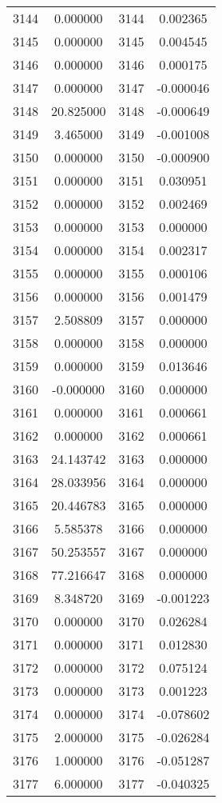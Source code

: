 \documentclass[12pt]{article}
\begin{document}
\begin{longtable}{@{}cccc@{}}
3144 & 0.000000 & 3144 & 0.002365 \\
3145 & 0.000000 & 3145 & 0.004545 \\
3146 & 0.000000 & 3146 & 0.000175 \\
3147 & 0.000000 & 3147 & -0.000046 \\
3148 & 20.825000 & 3148 & -0.000649 \\
3149 & 3.465000 & 3149 & -0.001008 \\
3150 & 0.000000 & 3150 & -0.000900 \\
3151 & 0.000000 & 3151 & 0.030951 \\
3152 & 0.000000 & 3152 & 0.002469 \\
3153 & 0.000000 & 3153 & 0.000000 \\
3154 & 0.000000 & 3154 & 0.002317 \\
3155 & 0.000000 & 3155 & 0.000106 \\
3156 & 0.000000 & 3156 & 0.001479 \\
3157 & 2.508809 & 3157 & 0.000000 \\
3158 & 0.000000 & 3158 & 0.000000 \\
3159 & 0.000000 & 3159 & 0.013646 \\
3160 & -0.000000 & 3160 & 0.000000 \\
3161 & 0.000000 & 3161 & 0.000661 \\
3162 & 0.000000 & 3162 & 0.000661 \\
3163 & 24.143742 & 3163 & 0.000000 \\
3164 & 28.033956 & 3164 & 0.000000 \\
3165 & 20.446783 & 3165 & 0.000000 \\
3166 & 5.585378 & 3166 & 0.000000 \\
3167 & 50.253557 & 3167 & 0.000000 \\
3168 & 77.216647 & 3168 & 0.000000 \\
3169 & 8.348720 & 3169 & -0.001223 \\
3170 & 0.000000 & 3170 & 0.026284 \\
3171 & 0.000000 & 3171 & 0.012830 \\
3172 & 0.000000 & 3172 & 0.075124 \\
3173 & 0.000000 & 3173 & 0.001223 \\
3174 & 0.000000 & 3174 & -0.078602 \\
3175 & 2.000000 & 3175 & -0.026284 \\
3176 & 1.000000 & 3176 & -0.051287 \\
3177 & 6.000000 & 3177 & -0.040325 \\

\end{longtable}
\end{document}
